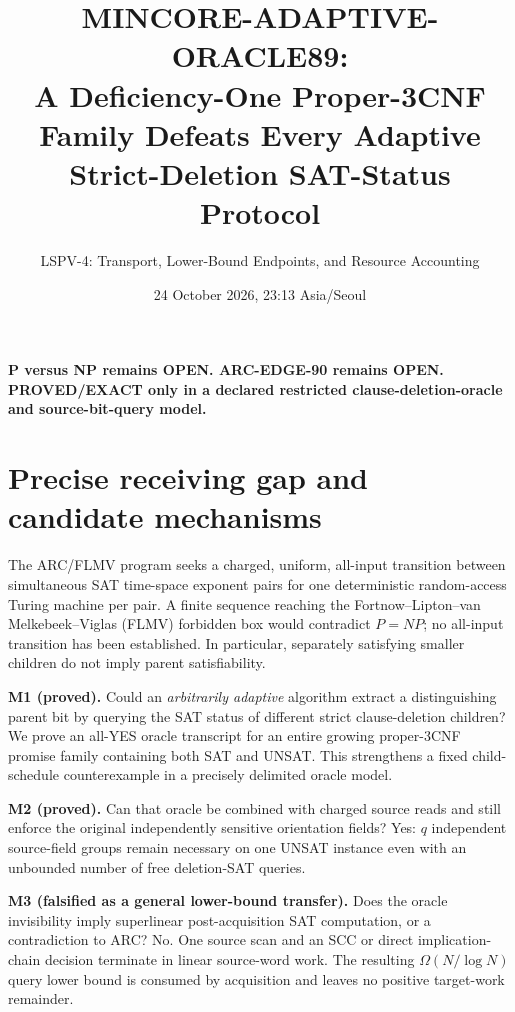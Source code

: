 \documentclass[11pt]{article}
\title{MINCORE-ADAPTIVE-ORACLE89:\\ A Deficiency-One Proper-3CNF Family Defeats Every Adaptive Strict-Deletion SAT-Status Protocol}
\author{LSPV-4: Transport, Lower-Bound Endpoints, and Resource Accounting}
\date{24 October 2026, 23:13 Asia/Seoul}
\begin{document}
\maketitle
\begin{center}
\textbf{P versus NP remains OPEN. ARC-EDGE-90 remains OPEN.}\\
\textbf{PROVED/EXACT only in a declared restricted clause-deletion-oracle and source-bit-query model.}
\end{center}

\section{Precise receiving gap and candidate mechanisms}
The ARC/FLMV program seeks a charged, uniform, all-input transition between simultaneous SAT time-space exponent pairs for one deterministic random-access Turing machine per pair. A finite sequence reaching the Fortnow--Lipton--van Melkebeek--Viglas (FLMV) forbidden box would contradict \(P=NP\); no all-input transition has been established. In particular, separately satisfying smaller children do not imply parent satisfiability.

\noindent\textbf{M1 (proved).} Could an \emph{arbitrarily adaptive} algorithm extract a distinguishing parent bit by querying the SAT status of different strict clause-deletion children? We prove an all-YES oracle transcript for an entire growing proper-3CNF promise family containing both SAT and UNSAT. This strengthens a fixed child-schedule counterexample in a precisely delimited oracle model.

\par\noindent\textbf{M2 (proved).} Can that oracle be combined with charged source reads and still enforce the original independently sensitive orientation fields? Yes: \(q\) independent source-field groups remain necessary on one UNSAT instance even with an unbounded number of free deletion-SAT queries.

\par\noindent\textbf{M3 (falsified as a general lower-bound transfer).} Does the oracle invisibility imply superlinear post-acquisition SAT computation, or a contradiction to ARC? No. One source scan and an SCC or direct implication-chain decision terminate in linear source-word work. The resulting \(\Omega(N/\log N)\) query lower bound is consumed by acquisition and leaves no positive target-work remainder.
\end{document}

